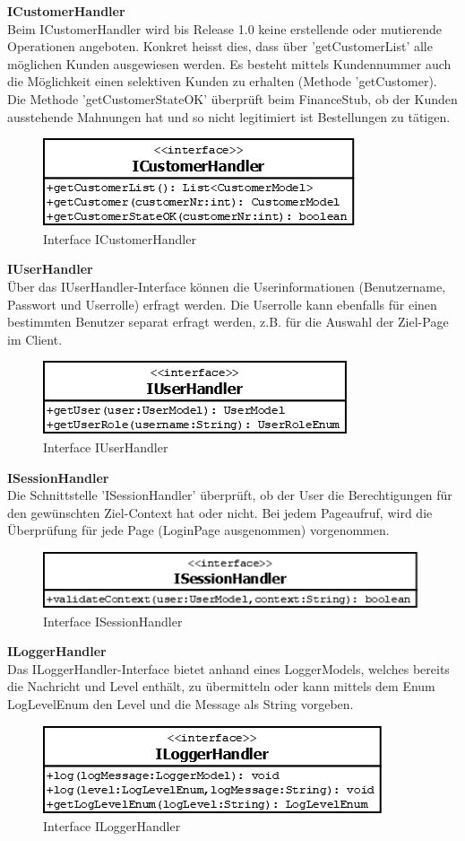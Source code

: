 \textbf{ICustomerHandler}\\
Beim ICustomerHandler wird bis Release 1.0 keine erstellende oder mutierende Operationen angeboten. Konkret heisst dies, dass über 'getCustomerList' alle möglichen Kunden ausgewiesen werden. Es besteht mittels Kundennummer auch die Möglichkeit einen selektiven Kunden zu erhalten (Methode 'getCustomer).\\
Die Methode 'getCustomerStateOK' überprüft beim FinanceStub, ob der Kunden ausstehende Mahnungen hat und so nicht legitimiert ist Bestellungen zu tätigen.
\begin{figure}[H]
	\includegraphics[width=0.4\linewidth]{Images/ICustomerHandler}
	\caption{Interface ICustomerHandler}
	\label{fig:if-ICustomerHandler}
\end{figure}
\textbf{IUserHandler}\\
Über das IUserHandler-Interface können die Userinformationen (Benutzername, Passwort und Userrolle) erfragt werden. Die Userrolle kann ebenfalls für einen bestimmten Benutzer separat erfragt werden, z.B. für die Auswahl der Ziel-Page im Client.
\begin{figure}[H]
	\includegraphics[width=0.4\linewidth]{Images/IUserHandler}
	\caption{Interface IUserHandler}
	\label{fig:if-IUserHandler}
\end{figure}
\textbf{ISessionHandler}\\
Die Schnittstelle 'ISessionHandler' überprüft, ob der User die Berechtigungen für den gewünschten Ziel-Context hat oder nicht. Bei jedem Pageaufruf, wird die Überprüfung für jede Page (LoginPage ausgenommen) vorgenommen.
\begin{figure}[H]
	\includegraphics[width=0.5\linewidth]{Images/ISessionHandler}
	\caption{Interface ISessionHandler}
	\label{fig:if-ISessionHandler}
\end{figure}
\textbf{ILoggerHandler}\\
Das ILoggerHandler-Interface bietet anhand eines LoggerModels, welches bereits die Nachricht und Level enthält, zu übermitteln oder kann mittels dem Enum LogLevelEnum den Level und die Message als String vorgeben.
\begin{figure}[H]
	\includegraphics[width=0.5\linewidth]{Images/ILoggerHandler}
	\caption{Interface ILoggerHandler}
	\label{fig:if-ILoggerHandler}
\end{figure}

